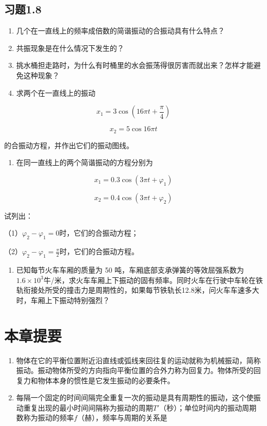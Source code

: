 \subsection{习题1.8}\label{ux4e60ux98981.8}

\begin{enumerate}
\def\labelenumi{\arabic{enumi}.}
\item
  几个在一直线上的频率成倍数的简谐振动的合振动具有什么特点？
\item
  共振现象是在什么情况下发生的？
\item
  挑水桶担走路时，为什么有时桶里的水会振荡得很厉害而就出来？怎样才能避免这种现象？
\item
  求两个在一直线上的振动
\end{enumerate}

\[
x _ {1} = 3 \cos \left(16 \pi t + \frac {\pi}{4}\right)
\]

\[
x _ {2} = 5 \cos 16 \pi t
\]

的合振动方程，并作出它们的振动图线。

\begin{enumerate}
\def\labelenumi{\arabic{enumi}.}
\setcounter{enumi}{4}
\tightlist
\item
  在同一直线上的两个简谐振动的方程分别为
\end{enumerate}

\[
x _ {1} = 0.3 \cos (3 \pi t + \varphi_ {1})
\]

\[
x _ {2} = 0.4 \cos (3 \pi t + \varphi_ {2})
\]

试列出：

（1）\(\varphi_{2}-\varphi_{1}=0\)时，它们的合振动方程；

（2）\(\varphi_{2}-\varphi_{1}=\frac{\pi}{2}\)时，它们的合振动方程。

\begin{enumerate}
\def\labelenumi{\arabic{enumi}.}
\setcounter{enumi}{5}
\tightlist
\item
  已知每节火车车厢的质量为 50
  吨，车厢底部支承弹簧的等效屈强系数为\(1.6 \times 10^{3}\)牛/米，求火车车厢上下振动的固有频率。同时火车在行驶中车轮在铁轨衔接处所受的撞击力是周期性的，如果每节铁轨长12.8米，问火车车速多大时，车厢上下振动特别强烈？
\end{enumerate}

\section{本章提要}\label{ux672cux7ae0ux63d0ux8981}

\begin{enumerate}
\def\labelenumi{\arabic{enumi}.}
\item
  物体在它的平衡位置附近沿直线或弧线来回往复的运动就称为机械振动，简称振动。振动物体所受的方向指向平衡位置的合外力称为回复力。物体所受的回复力和物体本身的惯性是它发生振动的必要条件。
\item
  每隔一个固定的时间间隔完全重复一次的振动是具有周期性的振动，这个使振动重复出现的最小时间间隔称为振动的周期\(T'\)（秒）；单位时间内的振动周期数称为振动的频率\(f\)（赫），频率与周期的关系是
\end{enumerate}


